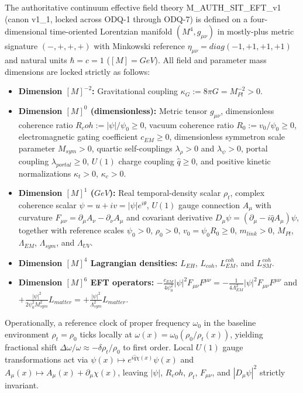 \documentclass[american,11pt,letterpaper]{article}
\newcommand{\Rcoh}{R_{\mathrm{coh}}}
\def\mathcal#1{#1}%
\def\mathrm#1{#1}%
\def\texttt#1{#1}%
\def\Rcoh{R_coh}%
\begin{document}
The authoritative continuum effective field theory \texttt{M\_AUTH\_SIT\_EFT\_v1} (canon \texttt{v1\_1}, locked across \texttt{ODQ-1} through \texttt{ODQ-7}) is defined on a four-dimensional time-oriented Lorentzian manifold $(\mathcal{M}^4, g_{\mu\nu})$ in mostly-plus metric signature $(-,+,+,+)$ with Minkowski reference $\eta_{\mu\nu} = \mathrm{diag}(-1,+1,+1,+1)$ and natural units $\hbar = c = 1$ ($[M] = \mathrm{GeV}$). All field and parameter mass dimensions are locked strictly as follows:
\begin{itemize}
  \item \textbf{Dimension $[M]^{-2}$:} Gravitational coupling $\kappa_G := 8\pi G = M_{\mathrm{Pl}}^{-2} > 0$.
  \item \textbf{Dimension $[M]^0$ (dimensionless):} Metric tensor $g_{\mu\nu}$, dimensionless coherence ratio $\Rcoh := |\psi|/\psi_0 \ge 0$, vacuum coherence ratio $R_0 := v_0/\psi_0 \ge 0$, electromagnetic gating coefficient $c_{\mathrm{EM}} \ge 0$, dimensionless symmetron scale parameter $M_{\mathrm{sym}} > 0$, quartic self-couplings $\lambda_\rho > 0$ and $\lambda_\psi > 0$, portal coupling $\lambda_{\mathrm{portal}} \ge 0$, $U(1)$ charge coupling $\hat{q} \ge 0$, and positive kinetic normalizations $\kappa_t > 0$, $\kappa_c > 0$.
  \item \textbf{Dimension $[M]^1$ ($\mathrm{GeV}$):} Real temporal-density scalar $\rho_t$, complex coherence scalar $\psi = u + iv = |\psi|e^{i\theta}$, $U(1)$ gauge connection $A_\mu$ with curvature $F_{\mu\nu} = \partial_\mu A_\nu - \partial_\nu A_\mu$ and covariant derivative $D_\mu\psi = (\partial_\mu - i\hat{q}A_\mu)\psi$, together with reference scales $\psi_0 > 0$, $\rho_0 > 0$, $v_0 = \psi_0 R_0 \ge 0$, $m_{\mathrm{link}} > 0$, $M_{\mathrm{Pl}}$, $\Lambda_{\mathrm{EM}}$, $\Lambda_{\mathrm{sym}}$, and $\Lambda_{\mathrm{UV}}$.
  \item \textbf{Dimension $[M]^4$ Lagrangian densities:} $\mathcal{L}_{\mathrm{EH}}$, $\mathcal{L}_{\mathrm{coh}}$, $\mathcal{L}_{\mathrm{EM}}^{\mathrm{coh}}$, and $\mathcal{L}_{\mathrm{SM}}^{\mathrm{coh}}$.
  \item \textbf{Dimension $[M]^6$ EFT operators:} $-\frac{c_{\mathrm{EM}}}{4\psi_0^2}|\psi|^2 F_{\mu\nu}F^{\mu\nu} = -\frac{1}{4\Lambda_{\mathrm{EM}}^2}|\psi|^2 F_{\mu\nu}F^{\mu\nu}$ and $+\frac{|\psi|^2}{2\psi_0^2 M_{\mathrm{sym}}^2}\mathcal{L}_{\mathrm{matter}} = +\frac{|\psi|^2}{\Lambda_{\mathrm{sym}}^2}\mathcal{L}_{\mathrm{matter}}$.
\end{itemize}

Operationally, a reference clock of proper frequency $\omega_0$ in the baseline environment $\rho_t = \rho_0$ ticks locally at $\omega(x) = \omega_0(\rho_0/\rho_t(x))$, yielding fractional shift $\Delta\omega/\omega \approx -\delta\rho_t/\rho_0$ to first order. Local $U(1)$ gauge transformations act via $\psi(x) \mapsto e^{i\hat{q}\chi(x)}\psi(x)$ and $A_\mu(x) \mapsto A_\mu(x) + \partial_\mu\chi(x)$, leaving $|\psi|$, $\Rcoh$, $\rho_t$, $F_{\mu\nu}$, and $|D_\mu\psi|^2$ strictly invariant.
\end{document}
